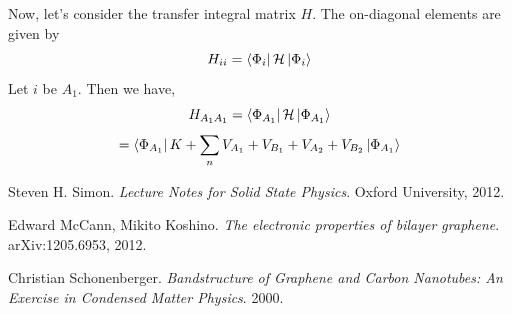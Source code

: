 \documentclass{article}
\begin{document}
Now, let's consider the transfer integral matrix $H$. The on-diagonal elements are given by
$$H_{ii} = \bra{\Phi_{i}}\mathcal{H}\ket{\Phi_{i}}$$
Let $i$ be $A_{1}$. Then we have,
$$H_{A_{1}A_{1}} = \bra{\Phi_{A_{1}}}\mathcal{H}\ket{\Phi_{A_{1}}}$$
$$ = \bra{\Phi_{A_{1}}}K + \sum_{n}V_{A_{1}} + V_{B_{1}} + V_{A_{2}} + V_{B_{2}}\ket{\Phi_{A_{1}}}$$

\begin{thebibliography}{9}
Steven H. Simon.
\textit{Lecture Notes for Solid State Physics}.
Oxford University, 2012.

Edward McCann, Mikito Koshino.
\textit{The electronic properties of bilayer graphene}.
arXiv:1205.6953, 2012.

Christian Schonenberger.
\textit{Bandstructure of Graphene and Carbon Nanotubes: An Exercise in Condensed Matter Physics}.
2000.

\end{thebibliography}
\end{document}
